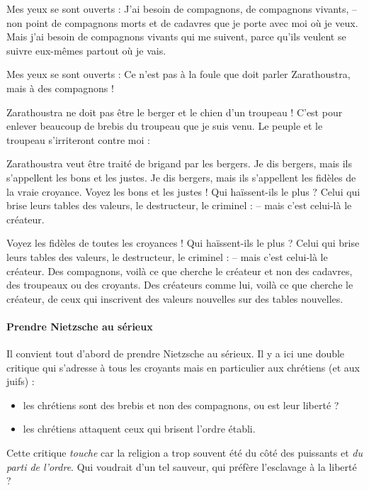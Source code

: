\begin{singlequote}
Mes yeux se sont ouverts : J’ai besoin de compagnons, de compagnons vivants, 
– non point de compagnons morts et de cadavres que je porte avec moi où je veux. Mais j’ai besoin de compagnons vivants qui me suivent, parce qu’ils veulent se suivre eux-mêmes partout où je vais. 

Mes yeux se sont ouverts : Ce n’est pas à la foule que doit parler Zarathoustra, mais à des compagnons ! 

Zarathoustra ne doit pas être le berger et le chien d’un troupeau ! 
C’est pour enlever beaucoup de brebis du troupeau que je suis venu. Le peuple et le troupeau s’irriteront contre moi : 

Zarathoustra veut être traité de brigand par les bergers. Je dis bergers, mais ils s’appellent les bons et les justes. Je dis bergers, mais ils s’appellent les fidèles de la vraie croyance. Voyez les bons et les justes ! Qui haïssent-ils le plus ? Celui qui brise leurs tables des valeurs, le destructeur, le criminel : 
– mais c’est celui-là le créateur. 

Voyez les fidèles de toutes les croyances ! Qui haïssent-ils le plus ? Celui qui brise leurs tables des valeurs, le destructeur, le criminel : 
– mais c’est celui-là le créateur. 
Des compagnons, voilà ce que cherche le créateur et non des cadavres, des troupeaux ou des croyants. Des créateurs comme lui, voilà ce que cherche le créateur, de ceux qui inscrivent des valeurs nouvelles sur des tables nouvelles. 
\end{singlequote}


\paragraph{Prendre Nietzsche au sérieux} Il convient tout d'abord de prendre Nietzsche au sérieux. Il y a ici une double critique qui s'adresse à tous les croyants mais en particulier aux chrétiens (et aux juifs) :
\begin{itemize}
    \item les chrétiens sont des brebis et non des compagnons, ou est leur liberté ?
    \item les chrétiens attaquent ceux qui brisent l'ordre établi.
\end{itemize}
Cette critique \textit{touche} car la religion a trop souvent été du côté des puissants et \textit{du parti de l'ordre}.
Qui voudrait d'un tel sauveur, qui préfère l'esclavage à la liberté ? 


